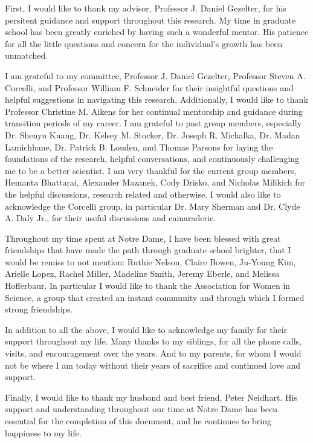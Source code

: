 \documentclass[noinfo,final,sort&compress]{nddiss2e}
\begin{document}
\begin{acknowledge}
First, I would like to thank my advisor, Professor J. Daniel Gezelter, for his persitent guidance and support throughout this research. My time in graduate school has been greatly enriched by having such a wonderful mentor.
His patience for all the little questions and concern for the individual's growth has been unmatched.

I am grateful to my committee, Professor J. Daniel Gezelter, Professor Steven A. Corcelli, and Professor William F. Schneider for their insightful questions and helpful suggestions in navigating this research.
Additionally, I would like to thank Professor Christine M. Aikens for her continual mentorship and guidance during transition periods of my career.
I am grateful to past group members, especially Dr. Shenyu Kuang, Dr. Kelsey M. Stocker, Dr. Joseph R. Michalka, Dr. Madan Lamichhane, Dr. Patrick B. Louden, and Thomas Parsons for laying the foundations of the research, helpful conversations, and continuously challenging me to be a better scientist.
I am very thankful for the current group members, Hemanta Bhattarai, Alexander Mazanek, Cody Drisko, and Nicholas Milikich for the helpful discussions, research related and otherwise.
I would also like to acknowledge the Corcelli group, in particular Dr. Mary Sherman and Dr. Clyde A. Daly Jr., for their useful discussions and camaraderie. 

Throughout my time spent at Notre Dame, I have been blessed with great friendships that have made the path through graduate school brighter, that I would be remiss to not mention: Ruthie Nelson, Claire Bowen, Ju-Young Kim, Arielle Lopez, Rachel Miller, Madeline Smith, Jeremy Eberle, and Melissa Hofferbaur. 
In particular I would like to thank the Association for Women in Science, a group that created an instant community and through which I formed strong friendships.

In addition to all the above, I would like to acknowledge my family for their support throughout my life. 
Many thanks to my siblings, for all the phone calls, visits, and encouragement over the years.
And to my parents, for whom I would not be where I am today without their years of sacrifice and continued love and support.

Finally, I would like to thank my husband and best friend, Peter Neidhart. His support and understanding throughout our time at Notre Dame has been essential for the completion of this document, and he continues to bring happiness to my life. 
%
\end{acknowledge}
\end{document}

